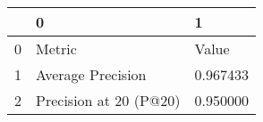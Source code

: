 \begin{tabular}{lll}
\toprule
 & 0 & 1 \\
\midrule
0 & Metric & Value \\
1 & Average Precision & 0.967433 \\
2 & Precision at 20 (P@20) & 0.950000 \\
\bottomrule
\end{tabular}
